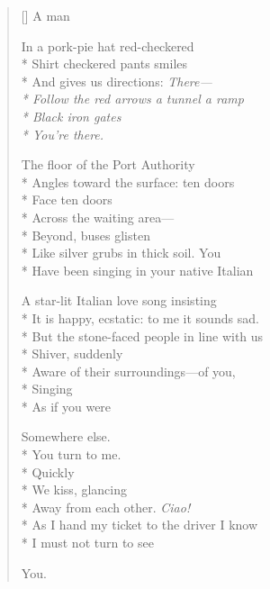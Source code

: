 \label{ch:orpheus}
\settowidth{\versewidth}{Follow the red arrows \qquad a tunnel \qquad a ramp}
\begin{verse}[\versewidth]
\hspace*{4\vgap} A man

In a pork-pie hat \qquad red-checkered\\*
Shirt \qquad checkered pants \qquad smiles\\*
And gives us directions: \qquad \textit{There---\\*
Follow the red arrows \qquad a tunnel \qquad a ramp\\*
Black iron gates\\*
You're there.}

The floor of the Port Authority\\*
Angles toward the surface: ten doors\\*
Face ten doors\\*
Across the waiting area---\\*
Beyond, buses glisten\\*
Like silver grubs in thick soil. \qquad You\\*
Have been singing in your native Italian

A star-lit Italian love song insisting\\*
It is happy, ecstatic: to me it sounds sad.\\*
But the stone-faced people in line with us\\*
Shiver, suddenly\\*
Aware of their surroundings---of you,\\*
Singing\\*
As if you were

Somewhere else.\\*
You turn to me.\\*
Quickly\\*
We kiss, glancing\\*
Away from each other. \qquad \textit{Ciao!}\\*
As I hand my ticket to the driver I know\\*
I must not turn to see

You.
\end{verse}
